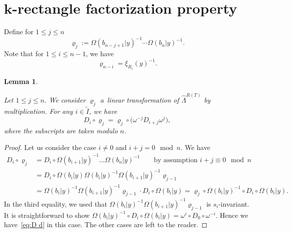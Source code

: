 \documentclass[pdftex]{sigma}
\numberwithin{equation}{section}
\newcommand{\co}{\xi}
\newcommand{\de}{\varrho}
\newtheorem{Lemma}[Theorem]{Lemma}
\theoremstyle{definition}
\begin{document}
\section[k-rectangle factorization property]{$\boldsymbol{k}$-rectangle factorization property}\label{sec:krect}
Define for $1\le j\le n$
\begin{equation}
\label{eq:def de}
\de_j:=
\Omega(b_{n-j+1}|y)^{-1}\cdots \Omega(b_{n}|y)^{-1}.
\end{equation}
Note that for $1\le i\le n-1$, we have
\begin{equation}
\de_{n-i}
=\co_{R_{i}}(y)^{-1}.
\label{eq:d Omega R}
\end{equation}
\begin{Lemma}\label{lem:commutation_relation_Omega}

Let $1\le j\le n$. We consider $\de_j$ a~linear transformation of
$\hat{\Lambda}^{R(T)}$ by multiplication.
For any $i\in \tilde{I}$, we have
\begin{equation}
{D}_i \circ \de_{j}
=\de_j\circ \bigl(\omega^{-j}D_{i+j} \omega^{j}\bigr),
\label{eq:D d}
\end{equation}
where the subscripts are taken modulo $n$.
\end{Lemma}
\begin{proof}
Let us consider the case $i\ne 0$ and $i+j= 0\mod n $.
We have
\begin{align*}
D_i \circ \de_j&=
D_i \circ \Omega(b_{i+1}|y)^{-1}\dots \Omega(b_{n}|y)^{-1}\qquad
\text{by assumption $i+j\equiv 0 \mod n$}\\
&=D_i \circ
\Omega(b_{i}|y)
\Omega(b_{i}|y)^{-1}
\Omega(b_{i+1}|y)^{-1}\de_{j-1}\\
&=\Omega(b_{i}|y)^{-1}
\Omega(b_{i+1}|y)^{-1}\de_{j-1}
\cdot
D_i \circ
\Omega(b_{i}|y)=\de_{j}
\circ
\Omega(b_{i}|y)^{-1}
\circ
D_i \circ
\Omega(b_{i}|y).
\end{align*}
In the third equality, we used that
$\Omega(b_{i}|y)^{-1}
\Omega(b_{i+1}|y)^{-1}\de_{j-1}$
is $s_i$-invariant.
It is straightforward to show
$
\Omega(b_{i}|y)^{-1}
\circ
D_i \circ
\Omega(b_{i}|y)=\omega^i
\circ D_0 \circ \omega^{-i}$.
Hence we have~\eqref{eq:D d} in this case.
The other cases are left to the reader.
\end{proof}
\end{document}
